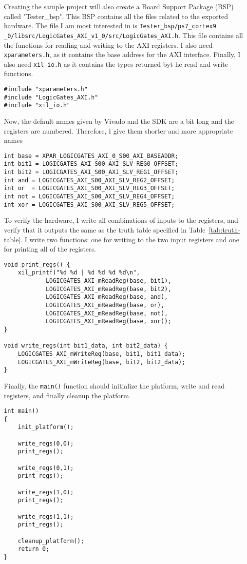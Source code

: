 Creating the sample project will also create a Board Support Package (BSP)
called "Tester\_bsp". This BSP contains all the files related to the exported
hardware. The file I am most interested in is \texttt{Tester\_bsp/ps7\_cortex9
\_0/libsrc/LogicGates\_AXI\_v1\_0/src/LogicGates\_AXI.h}. This file contains
all the functions for reading and writing to the AXI registers. I also need
\texttt{xparameters.h}, as it contains the base address for the AXI interface.
Finally, I also need \texttt{xil\_io.h} as it contains the types returned byt
he read and write functions.
\begin{lstlisting}
#include "xparameters.h"
#include "LogicGates_AXI.h"
#include "xil_io.h"
\end{lstlisting}
Now, the default names given by Vivado and the SDK are a bit long and the
registers are numbered. Therefore, I give them shorter and more appropriate
names
\begin{lstlisting}
int base = XPAR_LOGICGATES_AXI_0_S00_AXI_BASEADDR;
int bit1 = LOGICGATES_AXI_S00_AXI_SLV_REG0_OFFSET;
int bit2 = LOGICGATES_AXI_S00_AXI_SLV_REG1_OFFSET;
int and = LOGICGATES_AXI_S00_AXI_SLV_REG2_OFFSET;
int or  = LOGICGATES_AXI_S00_AXI_SLV_REG3_OFFSET;
int not = LOGICGATES_AXI_S00_AXI_SLV_REG4_OFFSET;
int xor = LOGICGATES_AXI_S00_AXI_SLV_REG5_OFFSET;
\end{lstlisting}
To verify the hardware, I write all combinations of inputs to the registers, and verify that it
outputs the same as the truth table specified in Table~\ref{tab:truth-table}. I
write two functions: one for writing to the two input registers and one for
printing all of the registers.
\begin{lstlisting}
void print_regs() {
    xil_printf("%d %d | %d %d %d %d\n",
            LOGICGATES_AXI_mReadReg(base, bit1),
            LOGICGATES_AXI_mReadReg(base, bit2),
            LOGICGATES_AXI_mReadReg(base, and),
            LOGICGATES_AXI_mReadReg(base, or),
            LOGICGATES_AXI_mReadReg(base, not),
            LOGICGATES_AXI_mReadReg(base, xor));
}

void write_regs(int bit1_data, int bit2_data) {
    LOGICGATES_AXI_mWriteReg(base, bit1, bit1_data);
    LOGICGATES_AXI_mWriteReg(base, bit2, bit2_data);
}
\end{lstlisting}
Finally, the \texttt{main()} function should initialize the platform, write and
read registers, and finally cleanup the platform.
\begin{lstlisting}
int main()
{
    init_platform();

    write_regs(0,0);
    print_regs();

    write_regs(0,1);
    print_regs();

    write_regs(1,0);
    print_regs();

    write_regs(1,1);
    print_regs();

    cleanup_platform();
    return 0;
}
\end{lstlisting}
